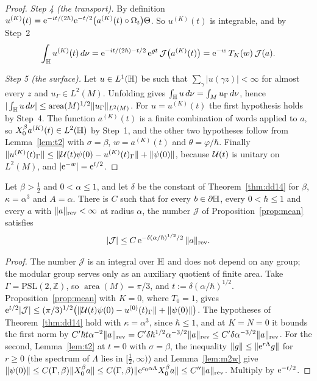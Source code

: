 \begin{proof}
\emph{Step 4 (the transport).} By definition $u^{(K)}(t)=\mathrm{e}^{-it/(2\hbar)}\mathrm{e}^{-t/2}\bigl(a^{(K)}(t)\circ\Omega_t\bigr)\Theta$. So
$u^{(K)}(t)$ is integrable, and by Step~2
\[
  \int_{\mathbb{H}}u^{(K)}(t)\,d\nu=\mathrm{e}^{-it/(2\hbar)-t/2}\,\mathrm{e}^{\varrho t}\,\mathcal J\bigl(a^{(K)}(t)\bigr)=\mathrm{e}^{-w}\,T_K(w)\,\mathcal J(a).
\]

\emph{Step 5 (the surface).} Let $u\in L^1(\mathbb{H})$ be such that $\sum_\gamma|u(\gamma z)|<\infty$ for almost every $z$ and
$u_\Gamma\in L^2(M)$. Unfolding gives $\int_{\mathbb{H}}u\,d\nu=\int_Mu_\Gamma\,d\nu$, hence
$|\int_{\mathbb{H}}u\,d\nu|\le\operatorname{area}(M)^{1/2}\lVert u_\Gamma\rVert_{L^2(M)}$. For $u=u^{(K)}(t)$ the first hypothesis holds by Step~4. The function
$a^{(K)}(t)$ is a finite combination of words applied to $a$, so $X_0^\beta a^{(K)}(t)\in L^2(\mathbb{H})$ by Step~1, and the other two
hypotheses follow from Lemma~\ref{lem:t2} with $\sigma=\beta$, $w=a^{(K)}(t)$ and $\theta=\varphi/\hbar$. Finally
$\lVert u^{(K)}(t)_\Gamma\rVert\le\lVert \mathcal{U}(t)\psi(0)-u^{(K)}(t)_\Gamma\rVert+\lVert \psi(0)\rVert$, because $\mathcal{U}(t)$ is unitary on $L^2(M)$, and
$|\mathrm{e}^{-w}|=\mathrm{e}^{t/2}$.
\end{proof}

\begin{corollary}\label{cor:meanJ}
Let $\beta>\tfrac12$ and $0<\alpha\le1$, and let $\delta$ be the constant of
Theorem~\ref{thm:dd14} for $\beta$, $\kappa=\alpha^3$ and $A=\alpha$. There is $C$ such that for every $b\in\partial\mathbb{H}$, every
$0<\hbar\le1$ and every $a$ with $\lVert a\rVert_{\mathrm{rev}}<\infty$ at radius $\alpha$, the number $\mathcal J$ of Proposition~\ref{prop:mean} satisfies
\[
  |\mathcal J|\le C\,\mathrm{e}^{-\delta(\alpha/\hbar)^{1/2}/2}\,\lVert a\rVert_{\mathrm{rev}} .
\]
\end{corollary}
\begin{proof}
The number $\mathcal J$ is an integral over $\mathbb{H}$ and does not depend on any group; the modular group serves only as an
auxiliary quotient of finite area. Take $\Gamma=\mathrm{PSL}(2,\mathbb Z)$, so $\operatorname{area}(M)=\pi/3$, and $t:=\delta(\alpha/\hbar)^{1/2}$. Proposition~\ref{prop:mean}
with $K=0$, where $T_0=1$, gives
$\mathrm{e}^{t/2}|\mathcal J|\le(\pi/3)^{1/2}\bigl(\lVert \mathcal{U}(t)\psi(0)-u^{(0)}(t)_\Gamma\rVert+\lVert \psi(0)\rVert\bigr)$. The hypotheses of
Theorem~\ref{thm:dd14} hold with $\kappa=\alpha^3$, since $\hbar\le1$, and at $K=N=0$ it bounds the first norm by
$C'\hbar t\alpha^{-2}\lVert a\rVert_{\mathrm{rev}}=C'\delta\hbar^{1/2}\alpha^{-3/2}\lVert a\rVert_{\mathrm{rev}}\le C'\delta\alpha^{-3/2}\lVert a\rVert_{\mathrm{rev}}$. For the second,
Lemma~\ref{lem:t2} at $t=0$ with $\sigma=\beta$, the inequality $\lVert g\rVert\le\lVert \mathrm{e}^{r\Lambda}g\rVert$ for $r\ge0$ (the spectrum of $\Lambda$ lies in
$[\tfrac12,\infty)$) and Lemma~\ref{lem:m2w} give
$\lVert \psi(0)\rVert\le C(\Gamma,\beta)\lVert X_0^\beta a\rVert\le C(\Gamma,\beta)\lVert \mathrm{e}^{c_0\alpha\Lambda}X_0^\beta a\rVert\le C''\lVert a\rVert_{\mathrm{rev}}$. Multiply by
$\mathrm{e}^{-t/2}$.
\end{proof}

